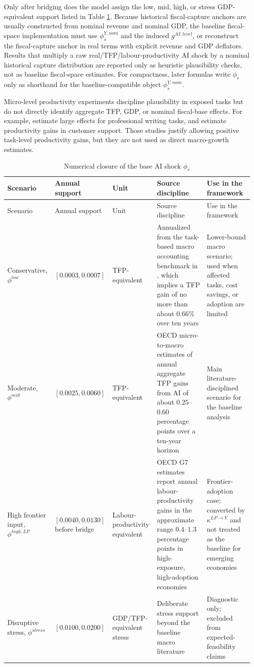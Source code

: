 \documentclass[11pt,a4paper]{article}
\begin{document}
Only after bridging does the model assign the low, mid, high, or stress GDP-equivalent support listed in Table \ref{tab:phi_numerical_closure}.
Because historical fiscal-capture anchors are usually constructed from nominal revenue and nominal GDP, the baseline fiscal-space implementation must use $\phi^{Y,nom}_s$ and the induced $g^{AI,level}$, or reconstruct the fiscal-capture anchor in real terms with explicit revenue and GDP deflators. Results that multiply a raw real/TFP/labour-productivity AI shock by a nominal historical capture distribution are reported only as heuristic plausibility checks, not as baseline fiscal-space estimates. For compactness, later formulas write $\phi_s$ only as shorthand for the baseline-compatible object $\phi^{Y,nom}_s$.

Micro-level productivity experiments discipline plausibility in exposed tasks but do not directly identify aggregate TFP, GDP, or nominal fiscal-base effects. For example, \citet{noy2023experimental} estimate large effects for professional writing tasks, and \citet{brynjolfsson2023generative} estimate productivity gains in customer support. Those studies justify allowing positive task-level productivity gains, but they are not used as direct macro-growth estimates.

\begin{longtable}{p{}p{}p{}p{}p{}}
\caption{Numerical closure of the base AI shock $\phi_s$}\label{tab:phi_numerical_closure}\\
\toprule
Scenario & Annual support & Unit & Source discipline & Use in the framework \\
\midrule
\endfirsthead
\toprule
Scenario & Annual support & Unit & Source discipline & Use in the framework \\
\midrule
\endhead
Conservative, $\phi^{low}$ & $[0.0003,0.0007]$ & TFP-equivalent & Annualized from the task-based macro accounting benchmark in \citet{acemoglu2024simple}, which implies a TFP gain of no more than about $0.66\%$ over ten years & Lower-bound macro scenario; used when affected tasks, cost savings, or adoption are limited \\
Moderate, $\phi^{mid}$ & $[0.0025,0.0060]$ & TFP-equivalent & OECD micro-to-macro estimates of annual aggregate TFP gains from AI of about $0.25$--$0.60$ percentage points over a ten-year horizon \citep{filippucci2024miracle} & Main literature-disciplined scenario for the baseline analysis \\
High frontier input, $\phi^{high,LP}$ & $[0.0040,0.0130]$ before bridge & Labour-productivity equivalent & OECD G7 estimates report annual labour-productivity gains in the approximate range $0.4$--$1.3$ percentage points in high-exposure, high-adoption economies \citep{oecd2025g7} & Frontier-adoption case; converted by $\kappa^{LP\to Y}$ and not treated as the baseline for emerging economies \\
Disruptive stress, $\phi^{stress}$ & $[0.0100,0.0200]$ & GDP/TFP-equivalent stress & Deliberate stress support beyond the baseline macro literature & Diagnostic only; excluded from expected-feasibility claims \\
\bottomrule
\end{longtable}
\end{document}
